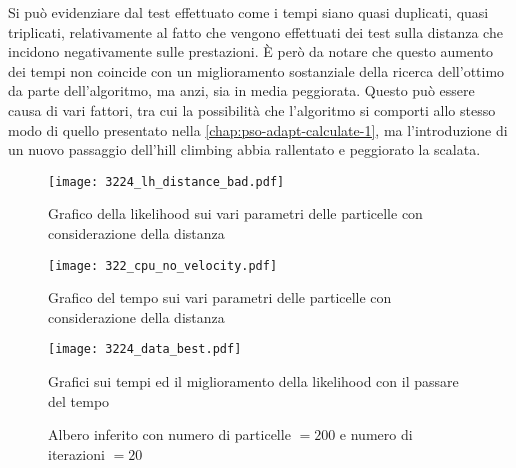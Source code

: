 Si può evidenziare dal test effettuato come i tempi siano quasi duplicati, quasi triplicati, relativamente al fatto che vengono effettuati dei test sulla distanza che incidono negativamente sulle prestazioni. È però da notare che questo aumento dei tempi non coincide con un miglioramento sostanziale della ricerca dell'ottimo da parte dell'algoritmo, ma anzi, sia in media peggiorata. Questo può essere causa di vari fattori, tra cui la possibilità che l'algoritmo si comporti allo stesso modo di quello presentato nella \autoref{chap:pso-adapt-calculate-1}, ma l'introduzione di un nuovo passaggio dell'hill climbing abbia rallentato e peggiorato la scalata.

\begin{figure}[!h]
  \centering
  \begin{minipage}{.45 \textwidth}
  \centering
  \texttt{[image: 3224\_lh\_distance\_bad.pdf]}
  \caption{Grafico della likelihood sui vari parametri delle particelle con considerazione della distanza}
  \end{minipage}
  \begin{minipage}{.45 \textwidth}
    \centering
    \texttt{[image: 322\_cpu\_no\_velocity.pdf]}
    \caption{Grafico del tempo sui vari parametri delle particelle con considerazione della distanza}
  \end{minipage}
  \label{fig:pso-adapt-calculate-1-graph}
\end{figure}

\begin{figure}[!h]
  \centering
  \texttt{[image: 3224\_data\_best.pdf]}
  \caption{Grafici sui tempi ed il miglioramento della likelihood con il passare del tempo}
  \label{}
\end{figure}

\begin{figure}[!h]
  \centering
  \caption{Albero inferito con numero di particelle $=200$ e numero di iterazioni $=20$}
  \label{}
\end{figure}

